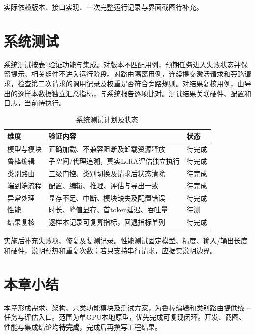 实际依赖版本、接口实现、一次完整运行记录与界面截图待补充。

\section{系统测试}

系统测试按表\ref{tab:system-tests}验证功能与集成。对版本不匹配用例，预期任务进入失败状态并保留提示，相关组件不进入运行阶段。对路由隔离用例，连续提交激活请求和旁路请求，检查第二次请求的调用记录及权重是否符合旁路规则。对结果复核用例，由导出的逐样本数据独立汇总指标，与系统报告逐项比对。测试结果关联硬件、配置和日志，当前待执行。
\begin{table}[htbp]
 \centering
 \caption{系统测试计划及状态}
 \label{tab:system-tests}
 \begin{tabular}{p{}p{}p{}}
 \toprule
 维度 & 验证内容 & 状态\\ \midrule
 模型与模块 & 正确加载、不兼容阻断及卸载资源释放 & 待完成\\
 鲁棒编辑 & 子空间/代理追溯，真实LoRA评估独立执行 & 待完成\\
 类别路由 & 三级门控、类别切换及请求后状态清除 & 待完成\\
 端到端流程 & 配置、编辑、推理、评估与导出一致 & 待完成\\
 异常处理 & 显存不足、中断、模块缺失及配置错误 & 待完成\\
 性能 & 时长、峰值显存、首token延迟、吞吐量 & 待测\\
 结果复核 & 逐样本记录可复算指标，回退指标单列 & 待完成\\
 \bottomrule
 \end{tabular}
\end{table}

实施后补充失败项、修复及复测记录。性能测试固定模型、精度、输入/输出长度和硬件，说明预热和重复次数；若只支持串行请求，应据实说明边界。

\section{本章小结}

本章形成需求、架构、六类功能模块及测试方案，为鲁棒编辑和类别路由提供统一任务与评估入口。范围为单GPU本地原型，优先完成可复现闭环。开发、截图、性能与集成结论均\textbf{待完成}，完成后再撰写工程结果。
